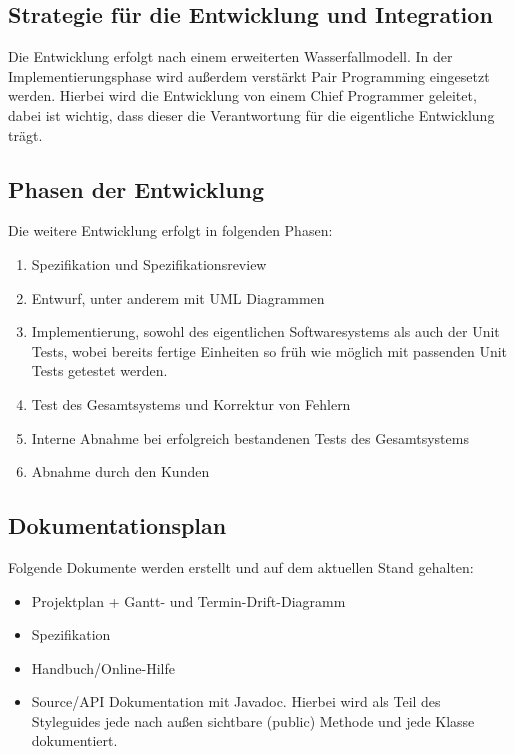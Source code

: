 \documentclass[a4paper,10pt]{scrartcl}
\begin{document}
\subsection{Strategie für die Entwicklung und Integration}
Die Entwicklung erfolgt nach einem erweiterten Wasserfallmodell.
In der Implementierungsphase wird außerdem verstärkt Pair Programming eingesetzt werden.
Hierbei wird die Entwicklung von einem Chief Programmer geleitet, dabei ist wichtig, dass dieser die Verantwortung für die eigentliche Entwicklung trägt.

\subsection{Phasen der Entwicklung}
Die weitere Entwicklung erfolgt in  folgenden Phasen:
\begin{enumerate}
\item
Spezifikation und Spezifikationsreview
\item
Entwurf, unter anderem mit UML Diagrammen
\item
Implementierung, sowohl des  eigentlichen Softwaresystems als auch der Unit Tests,
wobei bereits fertige Einheiten so früh wie möglich mit passenden Unit Tests getestet werden.
\item 
Test des Gesamtsystems und Korrektur von Fehlern
\item
Interne Abnahme bei erfolgreich bestandenen Tests des Gesamtsystems
\item
Abnahme durch den Kunden
\end{enumerate}
\subsection{Dokumentationsplan}
Folgende Dokumente werden erstellt und auf dem aktuellen Stand gehalten:
\begin{itemize}
\item Projektplan + Gantt- und Termin-Drift-Diagramm
\item Spezifikation
\item Handbuch/Online-Hilfe
\item Source/API Dokumentation mit Javadoc. Hierbei wird als Teil des Styleguides jede nach außen sichtbare (public) Methode und jede Klasse dokumentiert.
\end{itemize}
\end{document}
